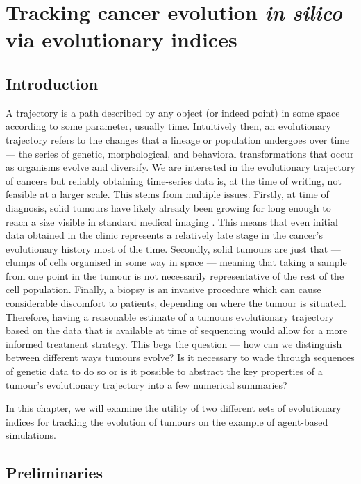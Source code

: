 \chapter{Tracking cancer evolution \textit{in silico} via evolutionary
indices}\label{chapter:trajectories}


\section{Introduction}
A trajectory is a path described by any object (or indeed point) in some space
according to some parameter, usually time.  Intuitively then, an evolutionary
trajectory refers to the changes that a lineage or population undergoes over
time --- the series of genetic, morphological, and behavioral transformations
that occur as organisms evolve and diversify. We are interested in the
evolutionary trajectory of cancers but reliably obtaining time-series data is,
at the time of writing, not feasible at a larger scale. This stems from multiple
issues. Firstly, at time of diagnosis, solid tumours have likely already been
growing for long enough to reach a size visible in standard medical imaging
\cite{patrone_how_2011}. This means that even initial data obtained in the
clinic represents a relatively late stage in the cancer's evolutionary history
most of the time. Secondly, solid tumours are just that --- clumps of cells
organised in some way in space --- meaning that taking a sample from one point
in the tumour is not necessarily representative of the rest of the cell
population. Finally, a biopsy is an invasive procedure which can cause
considerable discomfort to patients, depending on where the tumour is situated.
Therefore, having a reasonable estimate of a tumours evolutionary trajectory
based on the data that is available at time of sequencing would allow for a more
informed treatment strategy. This begs the question --- how can we distinguish
between different ways tumours evolve? Is it necessary to wade through sequences
of genetic data to do so or is it possible to abstract the key properties of a
tumour's evolutionary trajectory into a few numerical summaries? \par In this
chapter, we will examine the utility of two different sets of evolutionary
indices for tracking the evolution of tumours on the example of agent-based
simulations.


\section{Preliminaries}

